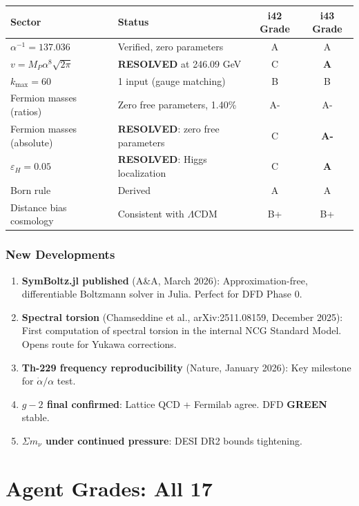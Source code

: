 \documentclass[11pt,a4paper]{article}
\newcommand{\GREEN}{\textcolor{dfdgreen}{\textbf{GREEN}}}
\newcommand{\RESOLVED}{\textcolor{dfdgreen}{\textbf{RESOLVED}}}
\begin{document}
\begin{center}
\begin{tabular}{llcc}
\toprule
\textbf{Sector} & \textbf{Status} & \textbf{i42 Grade} & \textbf{i43 Grade} \\
\midrule
$\alpha^{-1} = 137.036$ & Verified, zero parameters & A & A \\
$v = M_P \alpha^8 \sqrt{2\pi}$ & \RESOLVED{} at 246.09 GeV & C & \textbf{A} \\
$k_{\max} = 60$ & 1 input (gauge matching) & B & B \\
Fermion masses (ratios) & Zero free parameters, 1.40\% & A- & A- \\
Fermion masses (absolute) & \RESOLVED{}: zero free parameters & C & \textbf{A-} \\
$\varepsilon_H = 0.05$ & \RESOLVED{}: Higgs localization & C & \textbf{A} \\
Born rule & Derived & A & A \\
Distance bias cosmology & Consistent with $\Lambda$CDM & B+ & B+ \\
\bottomrule
\end{tabular}
\end{center}

\section{New Developments}

\begin{enumerate}
\item \textbf{SymBoltz.jl published} (A\&A, March 2026): Approximation-free, differentiable Boltzmann solver in Julia. Perfect for DFD Phase 0.
\item \textbf{Spectral torsion} (Chamseddine et al., arXiv:2511.08159, December 2025): First computation of spectral torsion in the internal NCG Standard Model. Opens route for Yukawa corrections.
\item \textbf{Th-229 frequency reproducibility} (Nature, January 2026): Key milestone for $\dot{\alpha}/\alpha$ test.
\item \textbf{$g-2$ final confirmed}: Lattice QCD + Fermilab agree. DFD \GREEN{} stable.
\item \textbf{$\Sigma m_\nu$ under continued pressure}: DESI DR2 bounds tightening.
\end{enumerate}


\part{Agent Grades: All 17}
\end{document}
